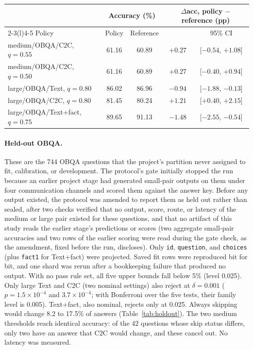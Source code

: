 \begin{table}[!htbp]
\begin{tabular*}{\linewidth}{@{}l@{\hspace{5pt}\extracolsep{\fill}}cccc@{}}
& \multicolumn{2}{c}{Accuracy (\%)} & \multicolumn{2}{c}{$\Delta$acc, policy $-$ reference (pp)}\\\cmidrule(lr){2-3}\cmidrule(l){4-5}
Policy & Policy & Reference & & 95\% CI\\\midrule
medium/OBQA/C2C, $q=0.55$ & 61.16 & 60.89 & $+0.27$ & [$-0.54$, $+1.08$]\\
medium/OBQA/C2C, $q=0.50$ & 61.16 & 60.89 & $+0.27$ & [$-0.40$, $+0.94$]\\
large/OBQA/Text, $q=0.80$ & 86.02 & 86.96 & $-0.94$ & [$-1.88$, $-0.13$]\\
large/OBQA/C2C, $q=0.80$ & 81.45 & 80.24 & $+1.21$ & [$+0.40$, $+2.15$]\\
large/OBQA/Text+fact, $q=0.75$ & 89.65 & 91.13 & $-1.48$ & [$-2.55$, $-0.54$]\\\bottomrule
\end{tabular*}
\end{table}

\paragraph{Held-out OBQA.} These are the 744 OBQA questions that the project's partition never assigned to fit, calibration, or development. The protocol's gate initially stopped the run because an earlier project stage had generated small-pair outputs on them under four communication channels and scored them against the answer key. Before any output existed, the protocol was amended to report them as held out rather than sealed, after two checks verified that no output, score, route, or latency of the medium or large pair existed for these questions, and that no artifact of this study reads the earlier stage's predictions or scores (two aggregate small-pair accuracies and two rows of the earlier scoring were read during the gate check, as the amendment, fixed before the run, discloses). Only \texttt{id}, \texttt{question}, and \texttt{choices} (plus \texttt{fact1} for Text+fact) were projected. Saved fit rows were reproduced bit for bit, and one shard was rerun after a bookkeeping failure that produced no output. With no pass rule set, all five upper bounds fall below 5\% (level 0.025). Only large Text and C2C (two nominal settings) also reject at $\delta=0.001$ ($p=1.5\times10^{-4}$ and $3.7\times10^{-4}$; with Bonferroni over the five tests, their family level is 0.005). Text+fact, also nominal, rejects only at 0.025. Always skipping would change 8.2 to 17.5\% of answers (Table~\ref{tab:holdout}). The two medium thresholds reach identical accuracy: of the 42 questions whose skip status differs, only two have an answer that C2C would change, and these cancel out. No latency was measured.

